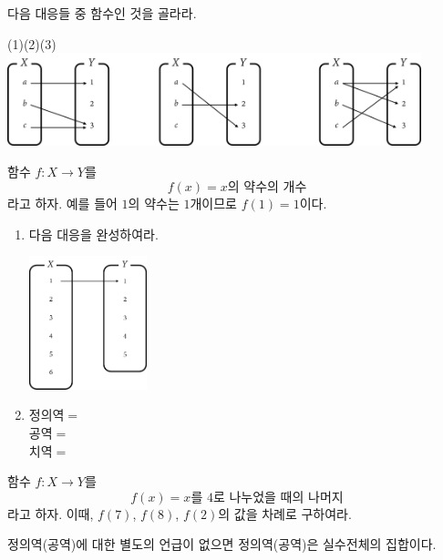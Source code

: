 \documentclass{oblivoir}
\begin{document}
%
\prob{}\label{function3}
다음 대응들 중 함수인 것을 골라라.
\begin{center}
(1)\hspace{100pt}(2)\hspace{100pt}(3)\\
\includegraphics[width=0.9\textwidth]{function_3}
\end{center}

%
\label{function4}
함수 \(f:X\to Y\)를
\[f(x)=x\text{의 약수의 개수}\]
라고 하자.
예를 들어 \(1\)의 약수는 \(1\)개이므로 \(f(1)=1\)이다.
\begin{enumerate}
\item
다음 대응을 완성하여라.
\begin{center}
\includegraphics[width=0.27\textwidth]{function_4}
\end{center}
\item
정의역$=$\\
공역$=$\\
치역$=$
\end{enumerate}

%
\label{function5}
 함수 \(f:X\to Y\)를
\[f(x)=x\text{를 4로 나누었을 때의 나머지}\]
라고 하자.
이때, \(f(7)\), \(f(8)\), \(f(2)\)의 값을 차례로 구하여라.

정의역(공역)에 대한 별도의 언급이 없으면
정의역(공역)은 실수전체의 집합이다.
\end{document}
